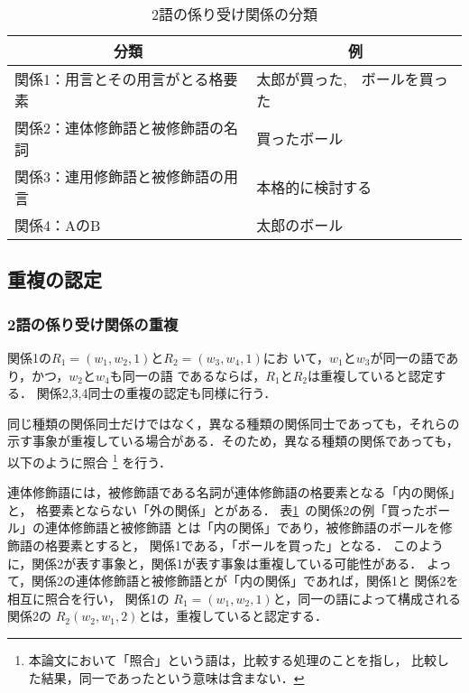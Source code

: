 \begin{table}[t]
\begin{center}
\caption{2語の係り受け関係の分類}\label{tab:nigonokankei}
\begin{tabular}{|l|l|}
\hline
 \multicolumn{1}{|c|}{分類} & \multicolumn{1}{c|}{例}\\
\hline \hline
 関係1：用言とその用言がとる格要素 & 太郎が買った,\ \ ボールを買った\\
\hline
 関係2：連体修飾語と被修飾語の名詞 & 買ったボール\\
\hline
 関係3：連用修飾語と被修飾語の用言 & 本格的に検討する\\
\hline
 関係4：AのB & 太郎のボール\\
\hline
\end{tabular}
\end{center}
\end{table}

\subsection{重複の認定} \label{nintei_choufuku}
\subsubsection{2語の係り受け関係の重複} \label{nintei_choufuku_2go}
関係1の$R_{1} = (w_{1},w_{2},1)$と$R_{2} = (w_{3},w_{4},1)$にお
いて，$w_{1}$と$w_{3}$が同一の語であり，かつ，$w_{2}$と$w_{4}$も同一の語
であるならば，$R_{1}$と$R_{2}$は重複していると認定する．
関係2,3,4同士の重複の認定も同様に行う．

同じ種類の関係同士だけではなく，異なる種類の関係同士であっても，それらの
示す事象が重複している場合がある．そのため，異なる種類の関係であっても，
以下のように照合
\footnote{本論文において「照合」という語は，比較する処理のことを指し，
比較した結果，同一であったという意味は含まない．}
を行う．

\vspace{2ex}


連体修飾語には，被修飾語である名詞が連体修飾語の格要素となる「内の関係」と，
格要素とならない「外の関係」とがある\cite{teramura75}．
表\ref{tab:nigonokankei}~の関係2の例「買ったボール」の連体修飾語と被修飾語
とは「内の関係」であり，被修飾語のボールを修飾語の格要素とすると，
関係1である，「ボールを買った」となる．
このように，関係2が表す事象と，関係1が表す事象は重複している可能性がある．
よって，関係2の連体修飾語と被修飾語とが「内の関係」であれば，関係1と
関係2を相互に照合を行い，
関係1の
$R_{1}=(w_{1},w_{2},1)$と，同一の語によって構成される
関係2の
$R_{2}(w_{2},w_{1},2)$とは，重複していると認定する．

